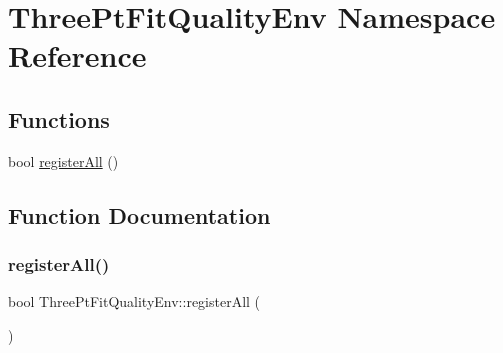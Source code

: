 \hypertarget{namespaceThreePtFitQualityEnv}{}\section{Three\+Pt\+Fit\+Quality\+Env Namespace Reference}
\label{namespaceThreePtFitQualityEnv}
\subsection*{Functions}
\begin{DoxyCompactItemize}
\item 
bool \mbox{\hyperlink{namespaceThreePtFitQualityEnv_a5a11d85a380642b75077fec4406ef5af}{register\+All}} ()
\end{DoxyCompactItemize}


\subsection{Function Documentation}
\mbox{\label{namespaceThreePtFitQualityEnv_a5a11d85a380642b75077fec4406ef5af}} 
\subsubsection{\texorpdfstring{registerAll()}{registerAll()}}
{\footnotesize\ttfamily bool Three\+Pt\+Fit\+Quality\+Env\+::register\+All (\begin{DoxyParamCaption}{ }\end{DoxyParamCaption})}

